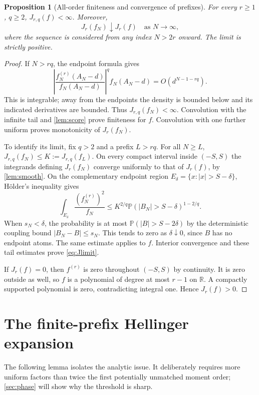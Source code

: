 \documentclass[11pt,a4paper]{article}
\numberwithin{equation}{section}
\newtheorem{proposition}[theorem]{Proposition}
\theoremstyle{definition}
\theoremstyle{remark}
\newcommand{\R}{\mathbb R}
\newcommand{\Prob}{\mathbb P}
\begin{document}
\begin{proposition}[All-order finiteness and convergence of prefixes]
\label{prop:Jconvergence}
For every $r\ge1$, $q\ge2$, $J_{r,q}(f)<\infty$. Moreover,
\begin{equation}
 J_r(f_N)\downarrow J_r(f)\quad\text{as }N\to\infty,
 \label{eq:Jlimit}
\end{equation}
where the sequence is considered from any index $N>2r$ onward. The limit
is strictly positive.
\end{proposition}
\begin{proof}
If $N>rq$, the endpoint formula gives
\[
 \left|\frac{f_N^{(r)}(A_N-d)}{f_N(A_N-d)}\right|^q
 f_N(A_N-d)=O(d^{N-1-rq}).
\]
This is integrable; away from the endpoints the density is bounded below
and its indicated derivatives are bounded. Thus $J_{r,q}(f_N)<\infty$.
Convolution with the infinite tail and \cref{lem:score} prove finiteness for
$f$. Convolution with one further uniform proves monotonicity of $J_r(f_N)$.

To identify its limit, fix $q>2$ and a prefix $L>rq$. For all $N\ge L$,
$J_{r,q}(f_N)\le K:=J_{r,q}(f_L)$. On every compact interval inside
$(-S,S)$ the integrands defining $J_r(f_N)$ converge uniformly to that of
$J_r(f)$, by \cref{lem:smooth}. On the complementary endpoint region
$E_\delta=\{x:|x|>S-\delta\}$, H\"older's inequality gives
\begin{equation}
 \int_{E_\delta}\frac{(f_N^{(r)})^2}{f_N}
 \le K^{2/q}\Prob(|B_N|>S-\delta)^{1-2/q}.
 \label{eq:uniform-integrability}
\end{equation}
When $s_N<\delta$, the probability is at most
$\Prob(|B|>S-2\delta)$ by the deterministic coupling bound
$|B_N-B|\le s_N$. This tends to zero as $\delta\downarrow0$, since $B$
has no endpoint atoms. The same estimate applies to $f$. Interior convergence
and these tail estimates prove \eqref{eq:Jlimit}.

If $J_r(f)=0$, then $f^{(r)}$ is zero throughout $(-S,S)$ by continuity.
It is zero outside as well, so $f$ is a polynomial of degree at most $r-1$
on $\R$. A compactly supported polynomial is zero, contradicting integral
one. Hence $J_r(f)>0$.
\end{proof}

\section{The finite-prefix Hellinger expansion}
\label{sec:finite-expansion}

The following lemma isolates the analytic issue. It deliberately requires
more uniform factors than twice the first potentially unmatched moment
order; \cref{sec:phase} will show why the threshold is sharp.
\end{document}
